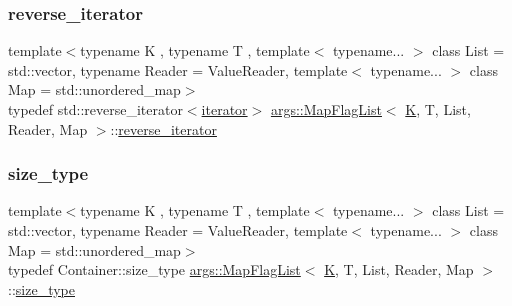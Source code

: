 \mbox{\label{classargs_1_1_map_flag_list_aa7c8974f4f3d7b51ab883967b665f52f}} 
\subsubsection{\texorpdfstring{reverse\+\_\+iterator}{reverse\_iterator}}
{\footnotesize\ttfamily template$<$typename K , typename T , template$<$ typename... $>$ class List = std\+::vector, typename Reader  = Value\+Reader, template$<$ typename... $>$ class Map = std\+::unordered\+\_\+map$>$ \\
typedef std\+::reverse\+\_\+iterator$<$\hyperlink{classargs_1_1_map_flag_list_a73b7f3d1f8e2dc8776c195c9d1b66d34}{iterator}$>$ \hyperlink{classargs_1_1_map_flag_list}{args\+::\+Map\+Flag\+List}$<$ \hyperlink{cgal__test_8cpp_a891e241aa245ae63618f03737efba309}{K}, T, List, Reader, Map $>$\+::\hyperlink{classargs_1_1_map_flag_list_aa7c8974f4f3d7b51ab883967b665f52f}{reverse\+\_\+iterator}}

\mbox{\label{classargs_1_1_map_flag_list_aad04984bb8472e997a4145620b88ffa5}} 
\subsubsection{\texorpdfstring{size\+\_\+type}{size\_type}}
{\footnotesize\ttfamily template$<$typename K , typename T , template$<$ typename... $>$ class List = std\+::vector, typename Reader  = Value\+Reader, template$<$ typename... $>$ class Map = std\+::unordered\+\_\+map$>$ \\
typedef Container\+::size\+\_\+type \hyperlink{classargs_1_1_map_flag_list}{args\+::\+Map\+Flag\+List}$<$ \hyperlink{cgal__test_8cpp_a891e241aa245ae63618f03737efba309}{K}, T, List, Reader, Map $>$\+::\hyperlink{classargs_1_1_map_flag_list_aad04984bb8472e997a4145620b88ffa5}{size\+\_\+type}}

\mbox{\label{classargs_1_1_map_flag_list_a6c8d512f511bdcfac07e0394ca187d67}} 
